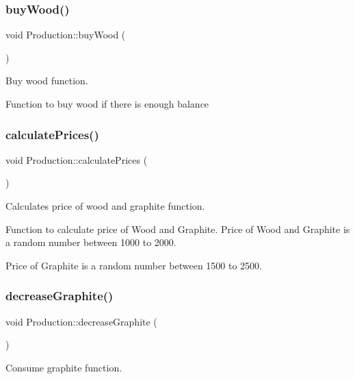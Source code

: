 \subsubsection{\texorpdfstring{buy\+Wood()}{buyWood()}}
{\footnotesize\ttfamily void Production\+::buy\+Wood (\begin{DoxyParamCaption}{ }\end{DoxyParamCaption})}

Buy wood function.

Function to buy wood if there is enough balance \mbox{\label{classProduction_a4a9bbd94b71b1d24d836d9ad79bed97b}} 
\subsubsection{\texorpdfstring{calculate\+Prices()}{calculatePrices()}}
{\footnotesize\ttfamily void Production\+::calculate\+Prices (\begin{DoxyParamCaption}{ }\end{DoxyParamCaption})}

Calculates price of wood and graphite function.

Function to calculate price of Wood and Graphite. Price of Wood and Graphite is a random number between 1000 to 2000.

Price of Graphite is a random number between 1500 to 2500. \mbox{\label{classProduction_aa5180ed4aac0e3d8ecec30596c9b1751}} 
\subsubsection{\texorpdfstring{decrease\+Graphite()}{decreaseGraphite()}}
{\footnotesize\ttfamily void Production\+::decrease\+Graphite (\begin{DoxyParamCaption}{ }\end{DoxyParamCaption})}

Consume graphite function. \mbox{\label{classProduction_a42c46b93e65cb3f84db76562a27d44f6}} 
